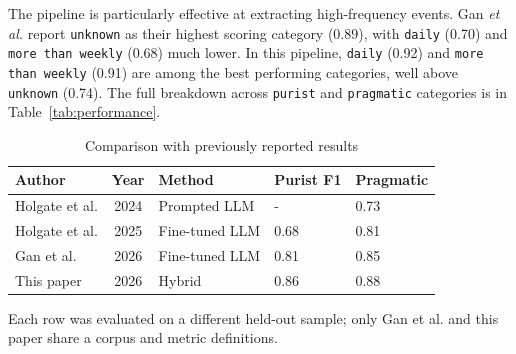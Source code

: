 \documentclass[conference]{IEEEtran}
\begin{document}
The pipeline is particularly effective at extracting 
high-frequency events. Gan \emph{et al.} report \texttt{unknown} 
as their highest scoring category (0.89), with \texttt{daily} (0.70) 
and \texttt{more than weekly} (0.68) much lower. In this pipeline, 
\texttt{daily} (0.92) and \texttt{more than weekly} (0.91) are among the 
best performing categories, well above \texttt{unknown} (0.74). 
The full breakdown across \texttt{purist} and \texttt{pragmatic} 
categories is in Table~\ref{tab:performance}.

\begin{table}[!t]
\caption{Comparison with previously reported results}
\label{tab:historical}
\centering
\begin{tabularx}{\linewidth}{Yclll}
\toprule
\textbf{Author} & \textbf{Year} & \textbf{Method} & \textbf{Purist F1} & \textbf{Pragmatic} \\
\midrule
Holgate et al. & 2024 & Prompted LLM & - & 0.73 \\
Holgate et al. & 2025 & Fine-tuned LLM & 0.68 & 0.81 \\
Gan et al. & 2026 & Fine-tuned LLM & 0.81 & 0.85 \\
\midrule
This paper & 2026 & Hybrid & 0.86 & 0.88 \\
\bottomrule
\end{tabularx}

\vspace*{2pt}
\begin{minipage}{\linewidth}
\raggedright\footnotesize
Each row was evaluated on a different held-out sample; only Gan et al. and this paper share a corpus and metric definitions.
\end{minipage}
\end{table}
\end{document}
